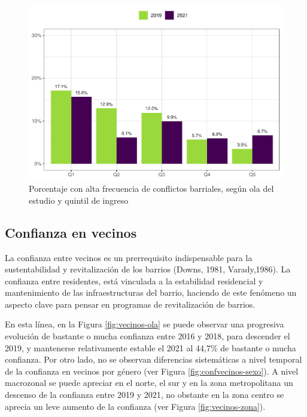 \documentclass[
  12pt,
]{book}
\begin{document}
\begin{figure}

{\centering \includegraphics{reporte-elsoc_files/figure-latex/confli-quintil-1} 

}

\caption{Porcentaje con alta frecuencia de conflictos barriales, según ola del estudio y quintil de ingreso}\label{fig:confli-quintil}
\end{figure}

\hypertarget{confianza-en-vecinos}{%
\subsection*{Confianza en vecinos}\label{confianza-en-vecinos}}

La confianza entre vecinos es un prerrequisito indispensable para la sustentabilidad y revitalización de los barrios (Downs, 1981, Varady,1986). La confianza entre residentes, está vinculada a la estabilidad residencial y mantenimiento de las infraestructuras del barrio, haciendo de este fenómeno un aspecto clave para pensar en programas de revitalización de barrios.

En esta línea, en la Figura \ref{fig:vecinos-ola} se puede observar una progresiva evolución de bastante o mucha confianza entre 2016 y 2018, para descender el 2019, y mantenerse relativamente estable el 2021 al 44,7\% de bastante o mucha confianza. Por otro lado, no se observan diferencias sistemáticas a nivel temporal de la confianza en vecinos por género (ver Figura \ref{fig:confvecinos-sexo}). A nivel macrozonal se puede apreciar en el norte, el sur y en la zona metropolitana un descenso de la confianza entre 2019 y 2021, no obstante en la zona centro se aprecia un leve aumento de la confianza (ver Figura \ref{fig:vecinos-zona}).
\end{document}
